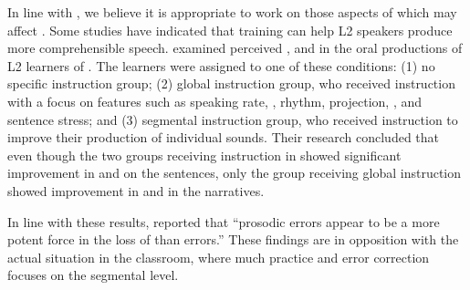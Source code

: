 \documentclass[output=paper]{langsci/langscibook}
\begin{document}
In line with \citet{DerwingMunro2009}, we believe it is appropriate to work on those aspects of  which may affect . Some studies have indicated that  training can help {L2} speakers produce more comprehensible speech. \citet{DerwingEtAl1998} examined perceived ,  and  in the oral productions of {L2} learners of . The learners were assigned to one of these conditions:
(1) no specific  instruction group; 
(2) global instruction group, who received instruction with a focus on features such as speaking rate, , rhythm, projection, , and sentence stress; and 
(3) segmental instruction group, who received instruction to improve their production of individual sounds. Their research concluded that even though the two groups receiving instruction in  showed significant improvement in  and  on the sentences, only the group receiving global instruction showed improvement in  and  in the narratives. 

In line with these results, \citet[285]{MunroDerwing1999} reported that “prosodic errors appear to be a more potent force in the loss of  than  errors.” These findings are in opposition with the actual situation in the  classroom, where much  practice and error correction focuses on the segmental level.
\end{document}
